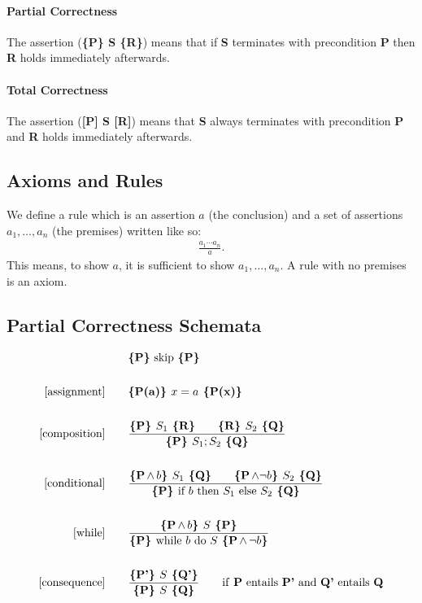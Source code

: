 \documentclass[a4paper, 12pt, twoside]{article}
\begin{document}
\paragraph{Partial Correctness} The assertion (\textbf{\{P\} S \{R\}})
means that if \textbf{S} terminates with precondition \textbf{P}
then \textbf{R} holds immediately afterwards.

\paragraph{Total Correctness} The assertion (\textbf{[P] S [R]})
means that \textbf{S} always terminates with precondition \textbf{P}
and \textbf{R} holds immediately afterwards.

\subsection{Axioms and Rules}

We define a rule which is an assertion $a$ (the conclusion)
and a set of assertions $a_1, \ldots, a_n$ (the premises)
written like so: \begin{gather*}
  \frac{a_1 \cdots a_n}{a}.
\end{gather*} This means, to show $a$, it is sufficient to show
$a_1, \ldots, a_n$. A rule with no premises is an axiom.

\subsection{Partial Correctness Schemata}

\begin{align*}
  [\text{skip}]& \qquad \textbf{\{P\}} \text{ skip } \textbf{\{P\}} \\ \\
  [\text{assignment}]& \qquad \textbf{\{P(a)\} } x = a \textbf{ \{P(x)\}} \\ \\
  [\text{composition}]& \qquad \frac{
    \textbf{\{P\} } S_1 \textbf{ \{R\}} \qquad
    \textbf{\{R\} } S_2 \textbf{ \{Q\}}
  }{
    \textbf{\{P\} } S_1; S_2 \textbf{ \{Q\}}
  } \\ \\
  [\text{conditional}]& \qquad \frac{
    \textbf{\{P$\, \land \, b$\} } S_1 \textbf{ \{Q\}} \qquad
    \textbf{\{P$\, \land \neg b$\} } S_2 \textbf{ \{Q\}}
  }{
    \textbf{\{P\} } \text{if } b \text{ then } S_1 \text{ else } S_2 \textbf{ \{Q\}}
  } \\ \\
  [\text{while}]& \qquad \frac{
    \textbf{\{P$\, \land \, b$\} } S \textbf{ \{P\}}
  }{
    \textbf{\{P\} } \text{while } b \text{ do } S \textbf{ \{P$\, \land \, \neg b$\}}
  } \\ \\
  [\text{consequence}]& \qquad \frac{
    \textbf{\{P'\} } S \textbf{ \{Q'\}}
  }{
    \textbf{\{P\} } S \textbf{ \{Q\}}
  } \qquad \text{if \textbf{P} entails \textbf{P'} and \textbf{Q'} entails \textbf{Q}} 
\end{align*}
\end{document}
